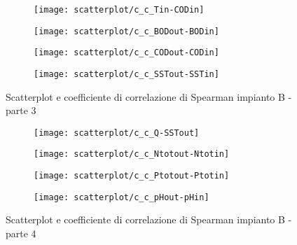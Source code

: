\begin{sidewaysfigure}[h]\ContinuedFloat
	\renewcommand*\thesubfigure{(\arabic{subfigure})}
	\begin{subfigure}{0.49\textwidth}
		\texttt{[image: scatterplot/c\_c\_Tin-CODin]}
		\caption{}
		\centering
	\end{subfigure}
	\begin{subfigure}{0.49\textwidth}
		\texttt{[image: scatterplot/c\_c\_BODout-BODin]}
		\caption{}
		\centering
	\end{subfigure}

	\begin{subfigure}{0.49\textwidth}
		\texttt{[image: scatterplot/c\_c\_CODout-CODin]}
		\caption{}
		\centering
	\end{subfigure}
	\begin{subfigure}{0.49\textwidth}
		\texttt{[image: scatterplot/c\_c\_SSTout-SSTin]}	
		\caption{}
		\centering
	\end{subfigure}
	\caption{Scatterplot e coefficiente di correlazione di Spearman impianto B - parte 3}
\end{sidewaysfigure}

\begin{sidewaysfigure}[h]\ContinuedFloat
	\renewcommand*\thesubfigure{(\arabic{subfigure})}
	\begin{subfigure}{0.49\textwidth}
		\texttt{[image: scatterplot/c\_c\_Q-SSTout]}
		\caption{}
		\centering
	\end{subfigure}
	\begin{subfigure}{0.49\textwidth}
		\texttt{[image: scatterplot/c\_c\_Ntotout-Ntotin]}
		\caption{}
		\centering
	\end{subfigure}

	\begin{subfigure}{0.49\textwidth}
		\texttt{[image: scatterplot/c\_c\_Ptotout-Ptotin]}
		\caption{}
		\centering
	\end{subfigure}
	\begin{subfigure}{0.49\textwidth}
		\texttt{[image: scatterplot/c\_c\_pHout-pHin]}	
		\caption{}
		\centering
	\end{subfigure}
	\caption{Scatterplot e coefficiente di correlazione di Spearman impianto B - parte 4}
\end{sidewaysfigure}

